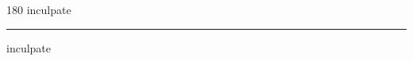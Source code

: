 
\begin{frame}
\begin{center}
\begin{turn}{180}
{\fontsize{2.5cm}{1em}\selectfont inculpate}
\end{turn}
\vspace{1em}\par  
\hrule
\vspace{1em}\par  
{\fontsize{2.5cm}{1em}\selectfont inculpate}
\end{center}
\end{frame}
